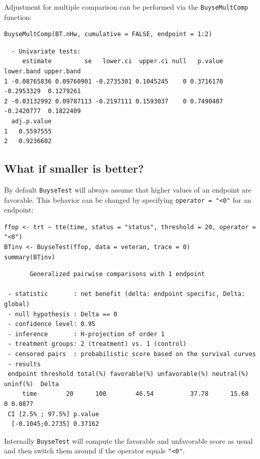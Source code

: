 \documentclass[12pt]{article}
\begin{document}
Adjustment for multiple comparison can be performed via the \texttt{BuyseMultComp} function:
\lstset{language=r,label= ,caption= ,captionpos=b,numbers=none}
\begin{lstlisting}
BuyseMultComp(BT.nHw, cumulative = FALSE, endpoint = 1:2)
\end{lstlisting}

\begin{verbatim}
  - Univariate tests:
     estimate         se   lower.ci  upper.ci null   p.value lower.band upper.band
1 -0.08765836 0.09760901 -0.2735301 0.1045245    0 0.3716170 -0.2953329  0.1279261
2 -0.03132992 0.09787113 -0.2197111 0.1593037    0 0.7490407 -0.2420777  0.1822409
  adj.p.value
1   0.5597555
2   0.9236602
\end{verbatim}



\clearpage

\subsection{What if smaller is better?}
\label{sec:org70d6214}
By default \texttt{BuyseTest} will always assume that higher values of an
endpoint are favorable. This behavior can be changed by specifying \texttt{operator = "<0"}
for an endpoint:
\lstset{language=r,label= ,caption= ,captionpos=b,numbers=none}
\begin{lstlisting}
ffop <- trt ~ tte(time, status = "status", threshold = 20, operator = "<0")
BTinv <- BuyseTest(ffop, data = veteran, trace = 0)
summary(BTinv)
\end{lstlisting}

\begin{verbatim}
       Generalized pairwise comparisons with 1 endpoint

 - statistic       : net benefit (delta: endpoint specific, Delta: global) 
 - null hypothesis : Delta == 0 
 - confidence level: 0.95 
 - inference       : H-projection of order 1
 - treatment groups: 2 (treatment) vs. 1 (control) 
 - censored pairs  : probabilistic score based on the survival curves
 - results
 endpoint threshold total(%) favorable(%) unfavorable(%) neutral(%) uninf(%)  Delta
     time        20      100        46.54          37.78      15.68        0 0.0877
 CI [2.5% ; 97.5%] p.value 
  [-0.1045;0.2735] 0.37162
\end{verbatim}

Internally \texttt{BuyseTest} will compute the favorable and unfavorable
score as usual and then switch them around if the operator equals
\texttt{"<0"}.
\end{document}
